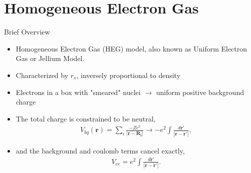 \documentclass[10pt]{beamer}
\begin{document}
{{{{\section{Homogeneous Electron Gas}

{%

\begin{frame}{Brief Overview}
	\begin{itemize}
		\item{Homogeneous Electron Gas (HEG) model, also known as Uniform Electron Gas or Jellium 
		Model.}
		\item{Characterized by \alert{$r_s$}, inversely proportional to density}
		\item{Electrons in a box with "smeared" nuclei $\rightarrow$ uniform positive background charge}

		\item{The total charge is constrained to be neutral,}
			\begin{eqnarray}
				V_{bg}(\mathbf{r}) = \sum\limits_{i} \frac{-Ze^2}{|\mathbf{r}-\mathbf{R_i}|} \rightarrow -e^2 \int \frac{d\mathbf{r'}}{|\mathbf{r}-\mathbf{r'}|},
			\end{eqnarray}
		\item{and the background and coulomb terms cancel exactly,
			\begin{eqnarray}
				V_{ee} = e^2 \int \frac{d\mathbf{r'}}{|\mathbf{r}-\mathbf{r'}|}.
			\end{eqnarray}
		}
	\end{itemize}
\end{frame}

{%

}}}}}}
\end{document}
